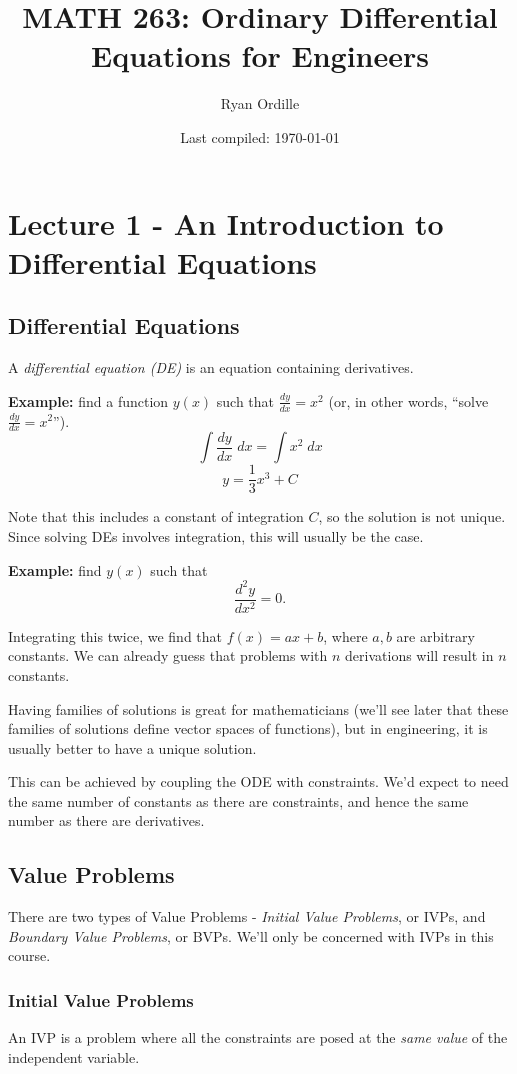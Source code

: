 \documentclass[11pt]{article}
\title{MATH 263: Ordinary Differential Equations for Engineers}
\author{Ryan Ordille}
\date{Last compiled: \today} %
\newcommand{\example}{\textbf{Example: }}
\newcommand{\fdx}{\frac{dy}{dx}} %
\newcommand{\sdx}{\frac{d^2y}{dx^2}}
\begin{document}
\maketitle

\pagestyle{myheadings}

\tableofcontents

\section{Lecture 1 - An Introduction to Differential Equations}
\subsection{Differential Equations}
	A \emph{differential equation (DE)} is an equation containing derivatives.

	\example find a function $y(x)$ such that $\fdx = x^2$ (or, in other words, ``solve $\fdx = x^2$'').
		$$\int \fdx \; dx = \int x^2 \; dx$$
		$$y = \frac{1}{3} x^3 + C$$

	Note that this includes a constant of integration $C$, so the solution is not unique. Since solving DEs involves integration, this will usually be the case.

	\example find $y(x)$ such that $$\sdx = 0.$$

	Integrating this twice, we find that $f(x) = ax + b$, where $a,b$ are arbitrary constants. We can already guess that problems with $n$ derivations will result in $n$ constants.

	Having families of solutions is great for mathematicians (we'll see later that these families of solutions define vector spaces of functions), but in engineering, it is usually better to have a unique solution.

	This can be achieved by coupling the ODE with constraints. We'd expect to need the same number of constants as there are constraints, and hence the same number as there are derivatives.

\subsection{Value Problems}
	There are two types of Value Problems - \emph{Initial Value Problems}, or IVPs, and \emph{Boundary Value Problems}, or BVPs.
	We'll only be concerned with IVPs in this course.

\subsubsection{Initial Value Problems}
	An IVP is a problem where all the constraints are posed at the \emph{same value} of the independent variable.
\end{document}

